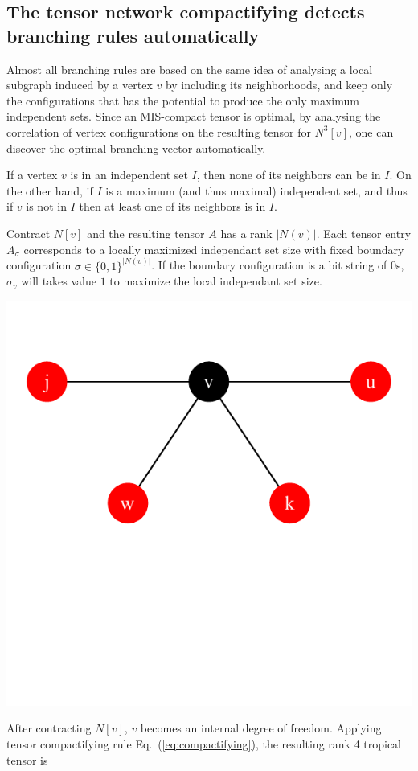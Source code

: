 \documentclass[review,onefignum,onetabnum]{siamart190516}
\newcommand{\<}{\langle}
\renewcommand{\>}{\rangle}
\newcommand{\Eq}[1]{Eq.~(\ref{#1})}
\begin{document}
\subsection{The tensor network compactifying detects branching rules automatically}
Almost all branching rules are based on the same idea of analysing a local subgraph induced by a vertex $v$
by including its neighborhoods,
and keep only the configurations that has the potential to produce the only maximum independent sets.
Since an MIS-compact tensor is optimal, by analysing the correlation of vertex configurations on the resulting tensor for $N^3[v]$, one can discover the optimal branching vector automatically.

\begin{corollary}\label{rule:one} %
  If a vertex $v$ is in an independent set $I$, then none of its neighbors can be in $I$.
On the other hand, if $I$ is a maximum (and thus maximal) independent set,
and thus if $v$ is not in $I$ then at least one of its neighbors is in $I$.
\end{corollary}

Contract $N[v]$ and the resulting tensor $A$ has a rank $|N(v)|$. Each tensor entry $A_{\sigma}$ corresponds to a locally maximized independant set size with fixed boundary configuration $\sigma \in \{0, 1\}^{|N(v)|}$.
If the boundary configuration is a bit string of 0s, $\sigma_v$ will takes value $1$ to maximize the local independant set size.

\centerline{\includegraphics[width=0.4\columnwidth,trim={0 3.5cm 0 1cm},clip]{../notebooks/basic.pdf}}

After contracting $N[v]$, $v$ becomes an internal degree of freedom.
Applying tensor compactifying rule \Eq{eq:compactifying}, the resulting rank 4 tropical tensor is
\end{document}
